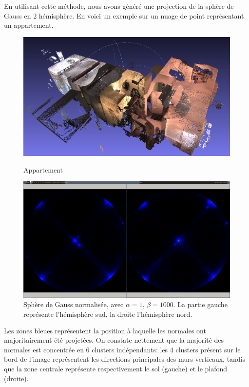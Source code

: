 \documentclass{article}
\begin{document}
En utilisant cette méthode, nous avons généré une projection de la sphère de Gauss en 2 hémisphère. En voici un exemple sur un nuage de point représentant un appartement.

\begin{figure}[H]
\centering
\includegraphics[width=\textwidth]{../2014-02-28-101630_1015x585_scrot.png}
\label{fig:appartement}
\caption{Appartement}

\centering
\includegraphics[width=\textwidth]{../2014-02-28-085643_1600x900_scrot.png}
\caption{Sphère de Gauss normalisée, avec $\alpha=1$, $\beta=1000$. La partie gauche représente l'hémisphère sud, la droite l'hémisphère nord.}
\label{fig:gauss_sphere_projection}
\end{figure}

Les zones bleues représentent la position à laquelle les normales ont majoritairement été projetées. On constate nettement que la majorité des normales est concentrée en 6 clusters indépendants: les 4 clusters présent sur le bord de l'image représentent les directions principales des murs verticaux, tandis que la zone centrale représente respectivement le sol (gauche) et le plafond (droite).
\end{document}

